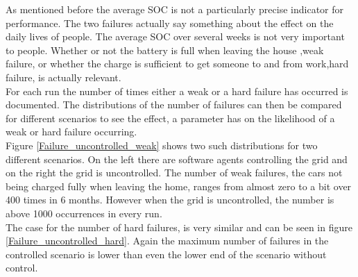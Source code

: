 \documentclass[a4paper]{article}
\begin{document}
As mentioned before the average SOC is not a particularly precise indicator for performance. The two failures actually say something 
about the effect on the daily lives of people. The average SOC over several weeks is not very important to people. Whether or 
not the battery is full when leaving the house ,weak failure, or whether the charge is sufficient to get someone to and from work,hard 
failure, is actually relevant. \\
For each run the number of times either a weak or a hard failure has occurred is documented. The distributions of the number 
of failures can then be compared for different scenarios to see the effect, a parameter has on the likelihood of a weak or hard failure
occurring.\\
Figure \ref{Failure_uncontrolled_weak} shows two such distributions for two different scenarios. On the left there are 
software agents controlling the grid and on the right the grid is uncontrolled. The number of weak failures, the cars not being 
charged fully when leaving the home, ranges from almost zero to a bit over 400 times in 6 months. However when the grid is uncontrolled, 
the number is above 1000 occurrences in every run. \\
The case for the number of hard failures, is very similar and can be seen in figure \ref{Failure_uncontrolled_hard}.
Again the maximum number of failures in the controlled scenario is lower than even the lower end of the scenario without control.\\
\end{document}
